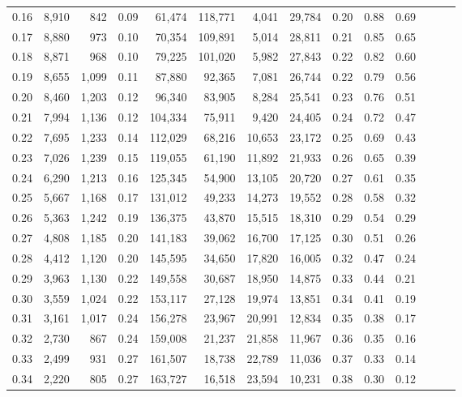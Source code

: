 \begin{tabular}{rrrrrrrrrrrrrr}
0.16 &  8,910 &    842 &  0.09 &   61,474 &  118,771 &   4,041 &  29,784 &  0.20 &  0.88 &      0.69 \\
0.17 &  8,880 &    973 &  0.10 &   70,354 &  109,891 &   5,014 &  28,811 &  0.21 &  0.85 &      0.65 \\
0.18 &  8,871 &    968 &  0.10 &   79,225 &  101,020 &   5,982 &  27,843 &  0.22 &  0.82 &      0.60 \\
0.19 &  8,655 &  1,099 &  0.11 &   87,880 &   92,365 &   7,081 &  26,744 &  0.22 &  0.79 &      0.56 \\
0.20 &  8,460 &  1,203 &  0.12 &   96,340 &   83,905 &   8,284 &  25,541 &  0.23 &  0.76 &      0.51 \\
0.21 &  7,994 &  1,136 &  0.12 &  104,334 &   75,911 &   9,420 &  24,405 &  0.24 &  0.72 &      0.47 \\
0.22 &  7,695 &  1,233 &  0.14 &  112,029 &   68,216 &  10,653 &  23,172 &  0.25 &  0.69 &      0.43 \\
0.23 &  7,026 &  1,239 &  0.15 &  119,055 &   61,190 &  11,892 &  21,933 &  0.26 &  0.65 &      0.39 \\
0.24 &  6,290 &  1,213 &  0.16 &  125,345 &   54,900 &  13,105 &  20,720 &  0.27 &  0.61 &      0.35 \\
0.25 &  5,667 &  1,168 &  0.17 &  131,012 &   49,233 &  14,273 &  19,552 &  0.28 &  0.58 &      0.32 \\
0.26 &  5,363 &  1,242 &  0.19 &  136,375 &   43,870 &  15,515 &  18,310 &  0.29 &  0.54 &      0.29 \\
0.27 &  4,808 &  1,185 &  0.20 &  141,183 &   39,062 &  16,700 &  17,125 &  0.30 &  0.51 &      0.26 \\
0.28 &  4,412 &  1,120 &  0.20 &  145,595 &   34,650 &  17,820 &  16,005 &  0.32 &  0.47 &      0.24 \\
0.29 &  3,963 &  1,130 &  0.22 &  149,558 &   30,687 &  18,950 &  14,875 &  0.33 &  0.44 &      0.21 \\
0.30 &  3,559 &  1,024 &  0.22 &  153,117 &   27,128 &  19,974 &  13,851 &  0.34 &  0.41 &      0.19 \\
0.31 &  3,161 &  1,017 &  0.24 &  156,278 &   23,967 &  20,991 &  12,834 &  0.35 &  0.38 &      0.17 \\
0.32 &  2,730 &    867 &  0.24 &  159,008 &   21,237 &  21,858 &  11,967 &  0.36 &  0.35 &      0.16 \\
0.33 &  2,499 &    931 &  0.27 &  161,507 &   18,738 &  22,789 &  11,036 &  0.37 &  0.33 &      0.14 \\
0.34 &  2,220 &    805 &  0.27 &  163,727 &   16,518 &  23,594 &  10,231 &  0.38 &  0.30 &      0.12 \\

\end{tabular}
